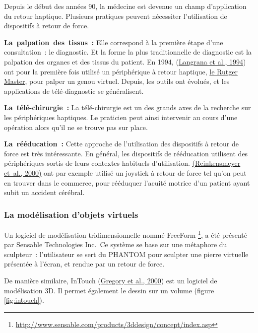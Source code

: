 \documentclass[
]{book}
\begin{document}
Depuis le début des années 90, la médecine est devenue un champ
d'application du retour haptique. Plusieurs pratiques peuvent nécessiter
l'utilisation de dispositifs à retour de force.

\textbf{La~palpation~des~tissus~:}
Elle correspond à la première étape d'une
consultation~: le diagnostic. Et la forme la plus traditionnelle de
diagnostic est la palpation des organes et des tissus du patient. En 1994,
(\protect\hyperlink{ref-langrana1994dynamic}{Langrana et al., 1994}) ont pour
la première fois utilisé un périphérique à retour haptique, \href{016-les-peripheriques-de-sortie-a-retour-haptique.html\#sub:Les-gants}{le Rutger
Master}, pour palper un genou virtuel. Depuis, les
outils ont évolués, et les applications de télé-diagnostic se
généralisent.

\textbf{La~télé-chirurgie~:}
La télé-chirurgie est un des grands axes de la
recherche sur les périphériques haptiques. Le praticien peut ainsi
intervenir au cours d'une opération alors qu'il ne se trouve pas sur
place.

\textbf{La~rééducation~:}
Cette approche de l'utilisation des dispositifs
à retour de force est très intéressante. En général, les dispositifs de
rééducation utilisent des périphériques sortis de leurs contextes habituels
d'utilisation. \href{047-bibliographie.html\#Reinkensmeyer2000}{(Reinkensmeyer
et~al., 2000)} ont par exemple utilisé un joystick à retour de
force tel qu'on peut en trouver dans le commerce, pour rééduquer l'acuité
motrice d'un patient ayant subit un accident cérébral.

\hypertarget{la-moduxe9lisation-dobjets-virtuels}{%
\subsubsection{La modélisation d'objets virtuels}\label{la-moduxe9lisation-dobjets-virtuels}}

Un logiciel de modélisation tridimensionnelle nommé
FreeForm \footnote{\url{http://www.sensable.com/products/3ddesign/concept/index.asp}}, a été
présenté par Sensable Technologies Inc.~Ce système se base sur une métaphore du
sculpteur~: l'utilisateur se sert du PHANTOM pour sculpter une pierre
virtuelle présentée à l'écran, et rendue par un retour de force.

De manière similaire, InTouch (\protect\hyperlink{ref-gregory2000intouch}{Gregory et al., 2000}) est un logiciel de
modélisation 3D. Il permet également le dessin sur un volume
(figure \ref{fig:intouch}).
\end{document}

